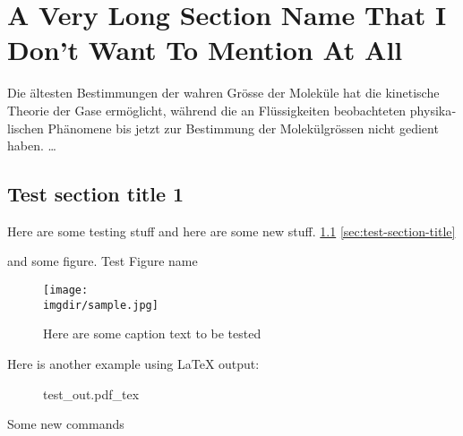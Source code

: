 \chapter{A Very Long Section Name That I Don't Want To Mention At All}
\label{ch:introduction}
\newcommand*\imgdir{img/ch-intro/}

%

\vspace{1em}

\begin{otherlanguage}{ngerman}
Die ältesten Bestimmungen der wahren Grösse der Moleküle hat die kinetische
Theorie der Gase ermöglicht, während die an Flüssigkeiten beobachteten
physikalischen Phänomene bis jetzt zur Bestimmung der Molekülgrössen nicht
gedient haben. \dots
\end{otherlanguage}



\section{Test section title 1}
\label{sec:test-section-title}

Here are some testing stuff and here are some new stuff. \ref{fig:test}
\autoref{sec:test-section-title}

and some figure. Test Figure name

\begin{figure}[htbp]
  \centering
  \texttt{[image: \\imgdir/sample.jpg]}
  \caption{\label{fig:test} Here are some caption text to be tested}
\end{figure}


Here is another example using \LaTeX{} output:
\begin{figure}[htbp]
  \centering
  \def\svgwidth{0.5\textwidth}
  {test_out.pdf_tex}
\end{figure}

Some new commands


  

